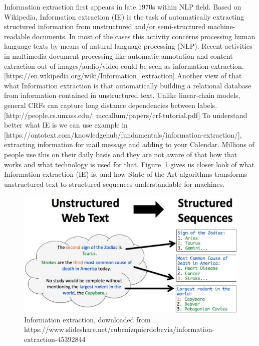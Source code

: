 \documentclass[thesis=M,english]{FITthesis}[2018/05/30]
\begin{document}
	Information extraction first appears in late 1970s within NLP field. %
Based on Wikipedia\cite{Wikipedia}, Information extraction (IE) is the task of automatically extracting structured information from unstructured and/or semi-structured machine-readable documents. In most of the cases this activity concerns processing human language texts by means of natural language processing (NLP). Recent activities in multimedia document processing like automatic annotation and content extraction out of images/audio/video could be seen as information extraction. [https://en.wikipedia.org/wiki/Information\_extraction] \cite{wiki:IE}
\linebreak Another view of that what Information extraction is that automatically building a relational database from information contained in unstructured text. Unlike linear-chain models, general CRFs can capture long distance dependencies between labels. [http://people.cs.umass.edu/~mccallum/papers/crf-tutorial.pdf]
\linebreak To understand better what IE is we can use example in [https://ontotext.com/knowledgehub/fundamentals/information-extraction/], extracting information for mail message and adding to your Calendar. Millions of people use this on their daily basis and they are not aware of that how that works and what technology is used for that.
\linebreak Figure~\ref{fig:InformationExtraction} gives us closer look of what Information extraction (IE) is, and how State-of-the-Art algorithms transforms unstructured text to structured sequences understandable for machines. 

	\begin{figure}[H]\centering
		\includegraphics[width=\textwidth]{information-extraction}
		\caption{Information extraction, downloaded from https://www.slideshare.net/rubenizquierdobevia/information-extraction-45392844}\label{fig:InformationExtraction}
	\end{figure}
\end{document}
